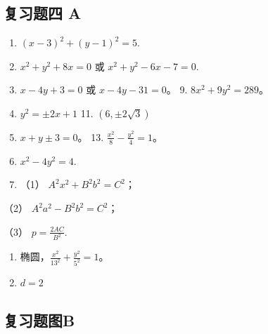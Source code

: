 \subsection{复习题四 A}\label{ux590dux4e60ux9898ux56db-a-1}

\begin{enumerate}
\def\labelenumi{\arabic{enumi}.}
\setcounter{enumi}{4}
\item
  \((x - 3)^{2} + (y - 1)^{2} = 5.\)
\item
  \(x^{2} + y^{2} + 8x = 0\) 或 \(x^{2} + y^{2} - 6x - 7 = 0.\)
\item
  \(x - 4y + 3 = 0\) 或 \(x - 4y - 31 = 0\)。 9.
  \(8x^{2} + 9y^{2} = 289\)。
\item
  \(y^{2} = \pm 2x + 1\) 11. \((6, \pm 2\sqrt{3})\)
\item
  \(x + y \pm 3 = 0\)。 13. \(\frac{x^2}{8} - \frac{y^2}{4} = 1\)。
\item
  \(x^{2} - 4y^{2} = 4.\)
\item
  （1） \(A^2 x^2 + B^2 b^2 = C^2\)；
\end{enumerate}

（2） \(A^2 a^2 - B^2 b^2 = C^2\)；

（3） \(p = \frac{2AC}{B^2}.\)

\begin{enumerate}
\def\labelenumi{\arabic{enumi}.}
\setcounter{enumi}{15}
\item
  椭圆，\(\frac{x^2}{13^2} + \frac{y^2}{5^2} = 1\)。
\item
  \(d = 2\)
\end{enumerate}

\subsection{复习题图B}\label{ux590dux4e60ux9898ux56feb}

